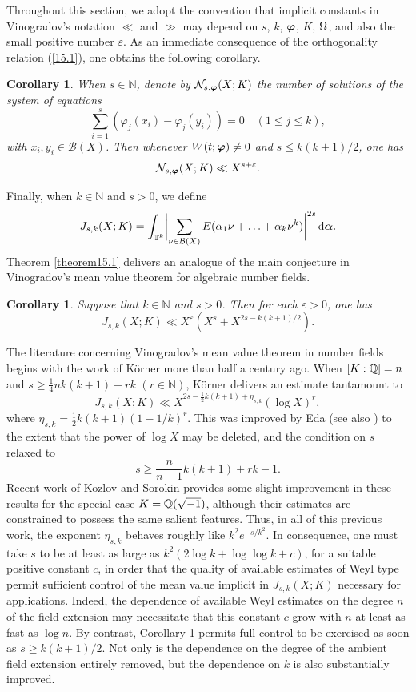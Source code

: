 \documentclass[12pt,reqno]{amsart}
\newtheorem{corollary}[theorem]{Corollary}
\theoremstyle{definition}
\theoremstyle{remark}
\numberwithin{equation}{section}
\def\calB{{\mathcal B}} \def\calBtil{{\widetilde \calB}}
\def\calN{{\mathcal N}}
\def\dbN{{\mathbb N}} \def\dbO{{\mathbb O}} \def\dbP{{\mathbb P}}
\def\alp{{\alpha}} \def\bfalp{{\boldsymbol \alpha}}
\def\eps{\varepsilon}
\def\le{\leqslant} \def\ge{\geqslant} \def\pleq{\preccurlyeq} \def\ple{\prec}
\def\d{{\,{\rm d}}}
\begin{document}
Throughout this section, we adopt the convention that implicit constants in Vinogradov's 
notation $\ll$ and $\gg$ may depend on $s$, $k$, ${\boldsymbol \varphi}$, $K$, ${\Omega}$, and also the 
small positive number $\eps$. As an immediate consequence of the orthogonality relation 
(\ref{15.1}), one obtains the following corollary.

\begin{corollary}\label{corollary15.2} When $s\in \dbN$, denote by 
$\calN_{s,\bfvarphi}(X;K)$ 
the number of solutions of the system of equations
$$\sum_{i=1}^s\left( \varphi_j(x_i)-\varphi_j(y_i)\right)=0\quad (1\le j\le k),$$
with $x_i,y_i\in \calB(X)$. Then whenever $W(t;{\boldsymbol \varphi})\ne 0$ and $s\le k(k+1)/2$, one 
has
$$\calN_{s,\bfvarphi}(X;K)\ll X^{s+\eps}.$$
\end{corollary}

Finally, when $k\in \dbN$ and $s>0$, we define
$$J_{s,k}(X;K)=\int_{\dbT^k}\biggl| \sum_{\nu\in \calB(X)}E(\alp_1\nu+\ldots 
+\alp_k\nu^k)\biggr|^{2s}\d\bfalp .$$
Theorem \ref{theorem15.1} delivers an analogue of the main conjecture in Vinogradov's 
mean value theorem for algebraic number fields.

\begin{corollary}\label{corollary15.3} Suppose that $k\in \dbN$ and $s>0$. Then for each 
$\eps>0$, one has
$$J_{s,k}(X;K)\ll X^\eps (X^s+X^{2s-k(k+1)/2}).$$
\end{corollary}

The literature concerning Vinogradov's mean value theorem in number fields begins with the 
work of K\"orner \cite{Kor1962} more than half a century ago. When $[K:{\mathbb Q}]=n$ and 
$s\ge \frac{1}{4}nk(k+1)+rk$ $(r\in \dbN)$, K\"orner \cite[Satz 1]{Kor1962} delivers an 
estimate tantamount to
$$J_{s,k}(X;K)\ll X^{2s-\frac{1}{2}k(k+1)+\eta_{s,k}}(\log X)^r,$$
where $\eta_{s,k}=\frac{1}{2}k(k+1)(1-1/k)^r$. This was improved by Eda \cite{Eda1967} 
(see also \cite[Lemma 4]{Eda1975}) to the extent that the power of $\log X$ may be 
deleted, and the condition on $s$ relaxed to
$$s\ge \frac{n}{n-1}k(k+1)+rk-1.$$
Recent work of Kozlov \cite{Koz2001} and Sorokin \cite{Sor2007} provides some slight 
improvement in these results for the special case $K={\mathbb Q}(\sqrt{-1})$, although their 
estimates are constrained to possess the same salient features. Thus, in all of this previous 
work, the exponent $\eta_{s,k}$ behaves roughly like $k^2e^{-s/k^2}$. In consequence, 
one must take $s$ to be at least as large as $k^2(2\log k+\log \log k+c)$, for a suitable 
positive constant $c$, in order that the quality of available estimates of Weyl type permit 
sufficient control of the mean value implicit in $J_{s,k}(X;K)$ necessary for applications. 
Indeed, the dependence of available Weyl estimates on the degree $n$ of the field 
extension may necessitate that this constant $c$ grow with $n$ at least as fast as $\log n$. 
By contrast, Corollary \ref{corollary15.3} permits full control to be exercised as soon as 
$s\ge k(k+1)/2$. Not only is the dependence on the degree of the ambient field extension 
entirely removed, but the dependence on $k$ is also substantially improved.\par
\end{document}
